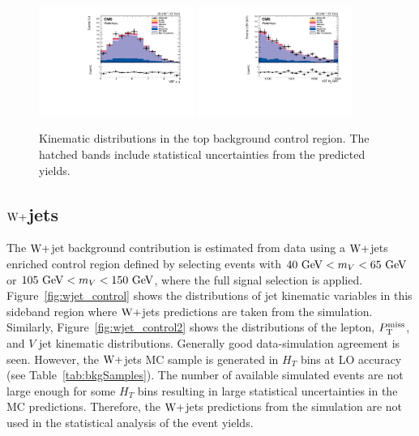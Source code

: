 \begin{figure}[!htbp]
\includegraphics[width=0.45\textwidth]{Plots/plots/DibosonBoostedElMuCuts13TeV_TTBarControlRegion_CHS_vbf_maxpt_jj_Deta.pdf}
\includegraphics[width=0.45\textwidth]{Plots/plots/DibosonBoostedElMuCuts13TeV_TTBarControlRegion_CHS_vbf_maxpt_jj_m.pdf}
\caption{Kinematic distributions in the top background control region. The hatched bands include statistical uncertainties from the predicted yields.}
\label{fig:top_control}
\end{figure}


\subsection{$\mathrm{W}+$jets}
The $\mathrm{W}+$jet background contribution is estimated from data using a $\mathrm{W}+$jets enriched control region defined by selecting events with $40~\mathrm{GeV} < m_{V} < 65~\mathrm{GeV}$ or $105~\mathrm{GeV} < m_{V} < 150~\mathrm{GeV}$, where the full signal selection is applied. Figure~\ref{fig:wjet_control} shows the distributions of jet kinematic variables in this sideband region where $\mathrm{W}+$jets predictions are taken from the simulation. Similarly, Figure~\ref{fig:wjet_control2} shows the distributions of the lepton, $P_\mathrm{T}^{\mathrm{miss}}$, and $V$ jet kinematic distributions. Generally good data-simulation agreement is seen. However, the $\mathrm{W}+$jets MC sample is generated in $H_{T}$ bins at LO accuracy (see Table~\ref{tab:bkgSamples}). The number of available simulated events are not large enough for some $H_{T}$ bins resulting in large statistical uncertainties in the MC predictions. Therefore, the $\mathrm{W}+$jets predictions from the simulation are not used in the statistical analysis of the event yields.

